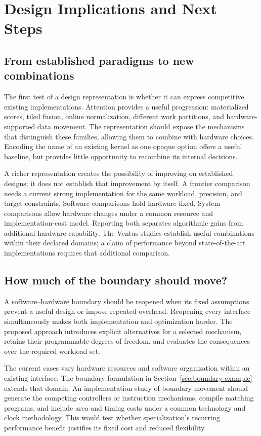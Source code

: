 \section{Design Implications and Next Steps}
\subsection{From established paradigms to new combinations}
The first test of a design representation is whether it can express competitive existing implementations. Attention provides a useful progression: materialized scores, tiled fusion, online normalization, different work partitions, and hardware-supported data movement. The representation should expose the mechanisms that distinguish these families, allowing them to combine with hardware choices. Encoding the name of an existing kernel as one opaque option offers a useful baseline, but provides little opportunity to recombine its internal decisions.

A richer representation creates the possibility of improving on established designs; it does not establish that improvement by itself. A frontier comparison needs a current strong implementation for the same workload, precision, and target constraints. Software comparisons hold hardware fixed. System comparisons allow hardware changes under a common resource and implementation-cost model. Reporting both separates algorithmic gains from additional hardware capability. The Ventus studies establish useful combinations within their declared domains; a claim of performance beyond state-of-the-art implementations requires that additional comparison.

\subsection{How much of the boundary should move?}
A software--hardware boundary should be reopened when its fixed assumptions prevent a useful design or impose repeated overhead. Reopening every interface simultaneously makes both implementation and optimization harder. The proposed approach introduces explicit alternatives for a selected mechanism, retains their programmable degrees of freedom, and evaluates the consequences over the required workload set.

The current cases vary hardware resources and software organization within an existing interface. The boundary formulation in Section~\ref{sec:boundary-example} extends that domain. An implementation study of boundary movement should generate the competing controllers or instruction mechanisms, compile matching programs, and include area and timing costs under a common technology and clock methodology. This would test whether specialization's recurring performance benefit justifies its fixed cost and reduced flexibility.

